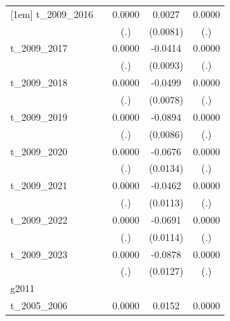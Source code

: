 \begin{table}[htbp]
\begin{tabular}{l*{4}{c}}
[1em]
t\_2009\_2016 &                     &      0.0000         &      0.0027         &      0.0000         \\
            &                     &         (.)         &    (0.0081)         &         (.)         \\
[1em]
t\_2009\_2017 &                     &      0.0000         &     -0.0414\sym{***}&      0.0000         \\
            &                     &         (.)         &    (0.0093)         &         (.)         \\
[1em]
t\_2009\_2018 &                     &      0.0000         &     -0.0499\sym{***}&      0.0000         \\
            &                     &         (.)         &    (0.0078)         &         (.)         \\
[1em]
t\_2009\_2019 &                     &      0.0000         &     -0.0894\sym{***}&      0.0000         \\
            &                     &         (.)         &    (0.0086)         &         (.)         \\
[1em]
t\_2009\_2020 &                     &      0.0000         &     -0.0676\sym{***}&      0.0000         \\
            &                     &         (.)         &    (0.0134)         &         (.)         \\
[1em]
t\_2009\_2021 &                     &      0.0000         &     -0.0462\sym{***}&      0.0000         \\
            &                     &         (.)         &    (0.0113)         &         (.)         \\
[1em]
t\_2009\_2022 &                     &      0.0000         &     -0.0691\sym{***}&      0.0000         \\
            &                     &         (.)         &    (0.0114)         &         (.)         \\
[1em]
t\_2009\_2023 &                     &      0.0000         &     -0.0878\sym{***}&      0.0000         \\
            &                     &         (.)         &    (0.0127)         &         (.)         \\
\hline
g2011       &                     &                     &                     &                     \\
t\_2005\_2006 &                     &      0.0000         &      0.0152\sym{***}&      0.0000         \\

\end{tabular}
\end{table}
